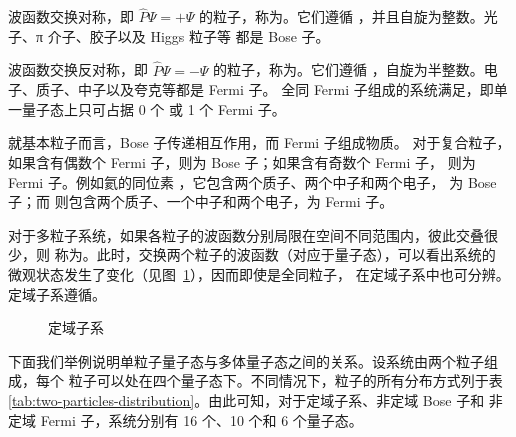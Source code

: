 波函数交换对称，即 $\hat{P}\Psi=+\Psi$ 的粒子，称为。它们遵循%
，并且自旋为整数。光子、π 介子、胶子以及 Higgs 粒子等
都是 Bose 子。

波函数交换反对称，即 $\hat{P}\Psi=-\Psi$ 的粒子，称为。它们遵循%
，自旋为半整数。电子、质子、中子以及夸克等都是 Fermi 子。
全同 Fermi 子组成的系统满足，即单一量子态上只可占据 0 个
或 1 个 Fermi 子。

就基本粒子而言，Bose 子传递相互作用，而 Fermi 子组成物质。
对于复合粒子，如果含有偶数个 Fermi 子，则为 Bose 子；如果含有奇数个 Fermi 子，
则为 Fermi 子。例如氦的同位素 ，它包含两个质子、两个中子和两个电子，
为 Bose 子；而  则包含两个质子、一个中子和两个电子，为 Fermi 子。

对于多粒子系统，如果各粒子的波函数分别局限在空间不同范围内，彼此交叠很少，则
称为。此时，交换两个粒子的波函数（对应于量子态），可以看出系统的
微观状态发生了变化（见图~\ref{fig:localized-sub-system}），因而即使是全同粒子，
在定域子系中也可分辨。定域子系遵循。

\begin{figure}[ht]
  \centering
  \FIGPLACEHOLDER
  \caption{定域子系}
  \label{fig:localized-sub-system}
\end{figure}

下面我们举例说明单粒子量子态与多体量子态之间的关系。设系统由两个粒子组成，每个
粒子可以处在四个量子态下。不同情况下，粒子的所有分布方式列于表~%
\ref{tab:two-particles-distribution}。由此可知，对于定域子系、非定域 Bose 子和
非定域 Fermi 子，系统分别有 16 个、10 个和 6 个量子态。

